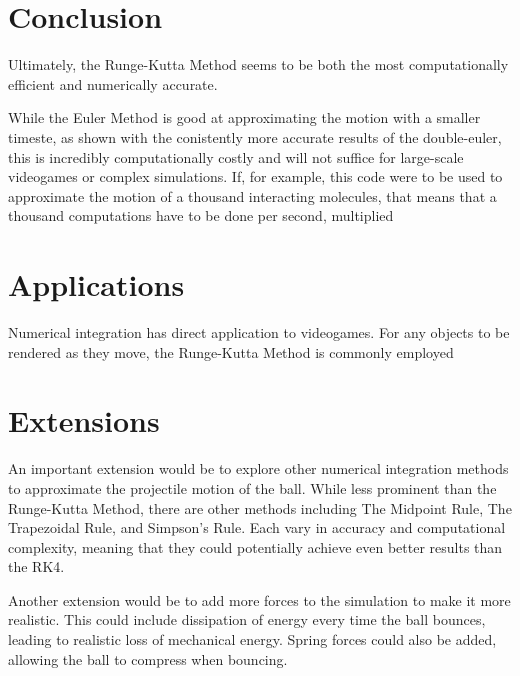 \documentclass[12pt]{article}
\begin{document}
\section{Conclusion}

Ultimately, the Runge-Kutta Method seems to be both the most computationally efficient and numerically accurate. 

While the Euler Method is good at approximating the motion with a smaller timeste, as shown with the conistently more accurate results of the double-euler, this is incredibly computationally costly and will not suffice for large-scale videogames or complex simulations. If, for example, this code were to be used to approximate the motion of a thousand interacting molecules, that means that a thousand computations have to be done per second, multiplied 

\section{Applications}

Numerical integration has direct application to videogames. For any objects to be rendered as they move, the Runge-Kutta Method is commonly employed

\section{Extensions}
An important extension would be to explore other numerical integration methods to approximate the projectile motion of the ball. While less prominent than the Runge-Kutta Method, there are other methods including The Midpoint Rule, The Trapezoidal Rule, and Simpson's Rule. Each vary in accuracy and computational complexity, meaning that they could potentially achieve even better results than the RK4. 

Another extension would be to add more forces to the simulation to make it more realistic. This could include dissipation of energy every time the ball bounces, leading to realistic loss of mechanical energy. Spring forces could also be added, allowing the ball to compress when bouncing. 
\end{document}
